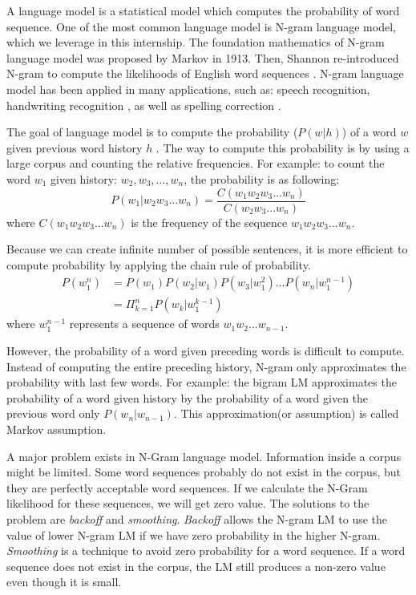 A language model is a statistical model which computes the probability of word sequence. One of the most common language model is N-gram language model, which we leverage in this internship. The foundation mathematics of N-gram language model was proposed by Markov in 1913. Then, Shannon re-introduced N-gram to compute the likelihoods of English word sequences \cite{Shannon:2001:MTC:584091.584093}. N-gram language model has been applied in many applications, such as: speech recognition\cite{Woodland2015}, handwriting recognition \cite{Poznanski2016}, as well as spelling correction \cite{Kukich1992}.

The goal of language model is to compute the probability ($P(w|h)$) of a word $w$ given previous word history $h$ . The way to compute this probability is by using a large corpus and counting the relative frequencies. For example: to count the word $w_{1}$ given history: $w_{2}, w_{3}, ..., w_{n}$, the probability is as following:
\begin{equation}
P(w_{1}|w_{2}w_{3}...w_{n})= \frac{C(w_{1}w_{2}w_{3}...w_{n})}{C(w_{2}w_{3}...w_{n})}
\end{equation}
where $C(w_{1}w_{2}w_{3}...w_{n})$ is the frequency of the sequence $w_{1}w_{2}w_{3}...w_{n}$.

Because we can create infinite number of possible sentences, it is more efficient to compute probability by applying the chain rule of probability. 
\begin{align*}
P(w_{1}^{n}) & =P(w_{1})P(w_{2}|w_{1})P(w_{3}|w_{1}^{2})...P(w_{n}|w_{1}^{n-1}) \\
& = \Pi_{k=1}^{n} P(w_{k}|w_{1}^{k-1})
\end{align*}
where $w_{1}^{n-1}$ represents a sequence of words $w_{1}w_{2}...w_{n-1}$.

However, the probability of a word given preceding words is difficult to  compute. Instead of computing the entire preceding history, N-gram only approximates the probability with last few words. For example: the bigram LM approximates the probability of a word given history by the probability of a word given the previous word only $P(w_{n}|w_{n-1})$.  This approximation(or assumption) is called Markov assumption.

A major problem exists in N-Gram language model. Information inside a corpus might be limited. Some word sequences probably do not exist in the corpus, but they are perfectly acceptable word sequences. If we calculate the N-Gram likelihood for these sequences, we will get zero value. The solutions to the problem are \textit{backoff} and \textit{smoothing}. \textit{Backoff} allows the N-gram LM to use the value of lower N-gram LM if we have zero probability in the higher N-gram.  \textit{Smoothing} is a technique to avoid  zero probability for a word sequence. If a word sequence does not exist in the corpus, the LM still produces a non-zero value even though it is small. 

